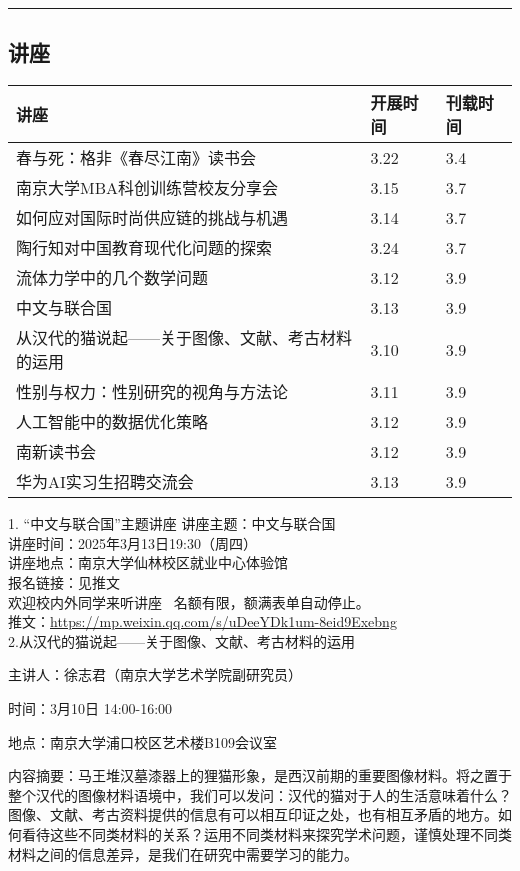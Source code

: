 \documentclass[letterpaper, 12pt]{article}
\begin{document}
\hrule
\pagebreak
\begin{multicols}{2}

\section{讲座}
\begin{tabular}{|>{\centering\arraybackslash}m{}|m{}|m{}|}
    \hline
    讲座 & 开展时间 & 刊载时间\\
    \hline\hline
    春与死：格非《春尽江南》读书会 & 3.22 & 3.4\\\hline
    南京大学MBA科创训练营校友分享会 & 3.15 & 3.7\\\hline
    如何应对国际时尚供应链的挑战与机遇 & 3.14 & 3.7\\\hline
    陶行知对中国教育现代化问题的探索 & 3.24 & 3.7\\\hline
    流体力学中的几个数学问题 & 3.12 & 3.9\\\hline
    中文与联合国 & 3.13 & 3.9\\\hline
    从汉代的猫说起——关于图像、文献、考古材料的运用 & 3.10 & 3.9\\\hline
    性别与权力：性别研究的视角与方法论 & 3.11 & 3.9\\\hline
    人工智能中的数据优化策略 & 3.12 & 3.9\\\hline
    南新读书会 & 3.12 & 3.9\\\hline
    华为AI实习生招聘交流会 & 3.13 & 3.9\\\hline
\end{tabular}
1. “中文与联合国”主题讲座
讲座主题：中文与联合国\\
讲座时间：2025年3月13日19:30（周四）\\
讲座地点：南京大学仙林校区就业中心体验馆\\
报名链接：见推文\\
欢迎校内外同学来听讲座~ 名额有限，额满表单自动停止。\\
推文：\url{https://mp.weixin.qq.com/s/uDeeYDk1um-8eid9Exebng}\\

2.从汉代的猫说起——关于图像、文献、考古材料的运用

主讲人：徐志君（南京大学艺术学院副研究员）

时间：3月10日 14:00-16:00

地点：南京大学浦口校区艺术楼B109会议室

内容摘要：马王堆汉墓漆器上的狸猫形象，是西汉前期的重要图像材料。将之置于整个汉代的图像材料语境中，我们可以发问：汉代的猫对于人的生活意味着什么？图像、文献、考古资料提供的信息有可以相互印证之处，也有相互矛盾的地方。如何看待这些不同类材料的关系？运用不同类材料来探究学术问题，谨慎处理不同类材料之间的信息差异，是我们在研究中需要学习的能力。\\


\end{multicols}
\end{document}
